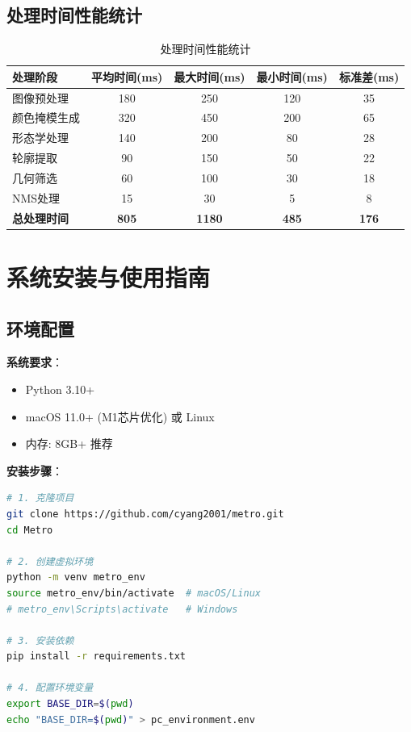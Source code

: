\documentclass[12pt,a4paper]{article}
\begin{document}
\subsection{处理时间性能统计}

\begin{table}[H]
    \centering
    \begin{tabular}{|l|c|c|c|c|}
        \hline
        \textbf{处理阶段} & \textbf{平均时间(ms)} & \textbf{最大时间(ms)} & \textbf{最小时间(ms)} & \textbf{标准差(ms)} \\
        \hline
        图像预处理 & 180 & 250 & 120 & 35 \\
        颜色掩模生成 & 320 & 450 & 200 & 65 \\
        形态学处理 & 140 & 200 & 80 & 28 \\
        轮廓提取 & 90 & 150 & 50 & 22 \\
        几何筛选 & 60 & 100 & 30 & 18 \\
        NMS处理 & 15 & 30 & 5 & 8 \\
        \hline
        \textbf{总处理时间} & \textbf{805} & \textbf{1180} & \textbf{485} & \textbf{176} \\
        \hline
    \end{tabular}
    \caption{处理时间性能统计}
    \label{tab:processing_time}
\end{table}

\section{系统安装与使用指南}

\subsection{环境配置}

\textbf{系统要求}：
\begin{itemize}
    \item Python 3.10+
    \item macOS 11.0+ (M1芯片优化) 或 Linux
    \item 内存: 8GB+ 推荐
\end{itemize}

\textbf{安装步骤}：
\begin{lstlisting}[language=Bash]
# 1. 克隆项目
git clone https://github.com/cyang2001/metro.git
cd Metro

# 2. 创建虚拟环境
python -m venv metro_env
source metro_env/bin/activate  # macOS/Linux
# metro_env\Scripts\activate   # Windows

# 3. 安装依赖
pip install -r requirements.txt

# 4. 配置环境变量
export BASE_DIR=$(pwd)
echo "BASE_DIR=$(pwd)" > pc_environment.env
\end{lstlisting}
\end{document}
